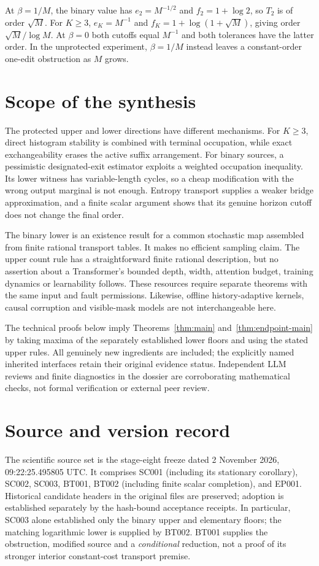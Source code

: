 \documentclass[11pt]{article}
\theoremstyle{remark}\newtheorem{remark}[theorem]{Remark}
\newcommand{\1}{\mathbf 1}
\begin{document}
At $\beta=1/M$, the binary value has $e_2=M^{-1/2}$ and $f_2=1+\log2$, so $T_2$ is of order $\sqrt M$. For $K\ge3$, $e_K=M^{-1}$ and $f_K=1+\log(1+\sqrt M)$, giving order $\sqrt M/\log M$. At $\beta=0$ both cutoffs equal $M^{-1}$ and both tolerances have the latter order. In the unprotected experiment, $\beta=1/M$ instead leaves a constant-order one-edit obstruction as $M$ grows.

\section{Scope of the synthesis}
The protected upper and lower directions have different mechanisms. For $K\ge3$, direct histogram stability is combined with terminal occupation, while exact exchangeability erases the active suffix arrangement. For binary sources, a pessimistic designated-exit estimator exploits a weighted occupation inequality. Its lower witness has variable-length cycles, so a cheap modification with the wrong output marginal is not enough. Entropy transport supplies a weaker bridge approximation, and a finite scalar argument shows that its genuine horizon cutoff does not change the final order.

The binary lower is an existence result for a common stochastic map assembled from finite rational transport tables. It makes no efficient sampling claim. The upper count rule has a straightforward finite rational description, but no assertion about a Transformer's bounded depth, width, attention budget, training dynamics or learnability follows. These resources require separate theorems with the same input and fault permissions. Likewise, offline history-adaptive kernels, causal corruption and visible-mask models are not interchangeable here.

The technical proofs below imply Theorems~\ref{thm:main} and~\ref{thm:endpoint-main} by taking maxima of the separately established lower floors and using the stated upper rules. All genuinely new ingredients are included; the explicitly named inherited interfaces retain their original evidence status. Independent LLM reviews and finite diagnostics in the dossier are corroborating mathematical checks, not formal verification or external peer review.

\appendix



\section{Source and version record}\label{app:provenance}
The scientific source set is the stage-eight freeze dated 2 November 2026, 09:22:25.495805 UTC. It comprises SC001 (including its stationary corollary), SC002, SC003, BT001, BT002 (including finite scalar completion), and EP001. Historical candidate headers in the original files are preserved; adoption is established separately by the hash-bound acceptance receipts. In particular, SC003 alone established only the binary upper and elementary floors; the matching logarithmic lower is supplied by BT002. BT001 supplies the obstruction, modified source and a \emph{conditional} reduction, not a proof of its stronger interior constant-cost transport premise.
\end{document}
